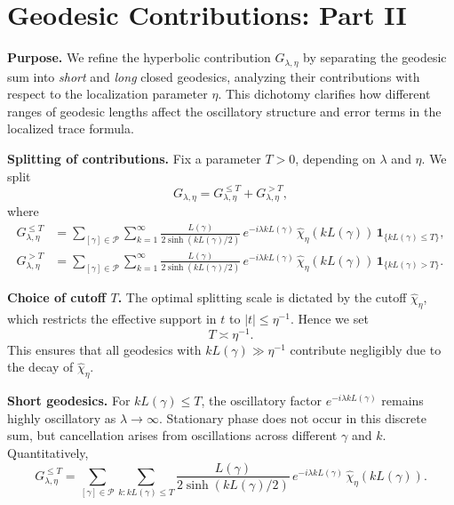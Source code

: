 
\section{Geodesic Contributions: Part II}

\noindent\textbf{Purpose.}
We refine the hyperbolic contribution $G_{\lambda,\eta}$ by separating the geodesic sum into \emph{short} and \emph{long} closed geodesics,  
analyzing their contributions with respect to the localization parameter $\eta$.  
This dichotomy clarifies how different ranges of geodesic lengths affect the oscillatory structure and error terms in the localized trace formula.

\medskip

\noindent\textbf{Splitting of contributions.}
Fix a parameter $T>0$, depending on $\lambda$ and $\eta$.  
We split
\[
  G_{\lambda,\eta} = G_{\lambda,\eta}^{\leq T} + G_{\lambda,\eta}^{>T},
\]
where
\begin{align*}
  G_{\lambda,\eta}^{\leq T}
  &= \sum_{[\gamma]\in\mathcal{P}} \sum_{k=1}^\infty
  \frac{L(\gamma)}{2\sinh(kL(\gamma)/2)}\,
  e^{-i\lambda kL(\gamma)}\,
  \widehat{\chi}_\eta(kL(\gamma))\,
  \mathbf{1}_{\{kL(\gamma)\leq T\}}, \\
  G_{\lambda,\eta}^{>T}
  &= \sum_{[\gamma]\in\mathcal{P}} \sum_{k=1}^\infty
  \frac{L(\gamma)}{2\sinh(kL(\gamma)/2)}\,
  e^{-i\lambda kL(\gamma)}\,
  \widehat{\chi}_\eta(kL(\gamma))\,
  \mathbf{1}_{\{kL(\gamma)>T\}}.
\end{align*}

\medskip

\noindent\textbf{Choice of cutoff $T$.}
The optimal splitting scale is dictated by the cutoff $\widehat{\chi}_\eta$,  
which restricts the effective support in $t$ to $|t|\leq \eta^{-1}$.  
Hence we set
\[
  T \asymp \eta^{-1}.
\]
This ensures that all geodesics with $kL(\gamma)\gg \eta^{-1}$ contribute negligibly due to the decay of $\widehat{\chi}_\eta$.

\medskip

\noindent\textbf{Short geodesics.}
For $kL(\gamma)\leq T$,  
the oscillatory factor $e^{-i\lambda kL(\gamma)}$ remains highly oscillatory as $\lambda\to\infty$.  
Stationary phase does not occur in this discrete sum,  
but cancellation arises from oscillations across different $\gamma$ and $k$.  
Quantitatively,
\[
  G_{\lambda,\eta}^{\leq T}
  = \sum_{[\gamma]\in\mathcal{P}} \sum_{k: kL(\gamma)\leq T}
  \frac{L(\gamma)}{2\sinh(kL(\gamma)/2)}\,
  e^{-i\lambda kL(\gamma)}\,
  \widehat{\chi}_\eta(kL(\gamma)).
\]

